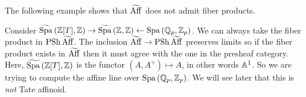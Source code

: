 \documentclass{article}
\begin{document}
The following example shows 
that $\widetilde{\mathrm{Aff}}$ does not admit fiber products.

\begin{eg}

  Consider $\widetilde{\mathrm{Spa}\,}(\mathbb{Z}[T] , \mathbb{Z}) \to \widetilde{\mathrm{Spa}\,}(\mathbb{Z} , \mathbb{Z})
  \leftarrow \mathrm{Spa}\,(\mathbb{Q}_p , \mathbb{Z}_p)$.
  We can always take the fiber product in
  $\operatorname{PSh} \widetilde{\mathrm{Aff}}$.
  The inclusion $\widetilde{\mathrm{Aff}} \to \operatorname{PSh} \widetilde{\mathrm{Aff}}$
  preserves limits so 
  if the fiber product exists in $\widetilde{\mathrm{Aff}}$
  then it must agree with the one in the presheaf category.
  Here, $\widetilde{\mathrm{Spa}\,}(\mathbb{Z}[T] , \mathbb{Z})$ 
  is the functor $(A , A^+) \mapsto A$,
  in other words $\mathbb{A}^1$. 
  So we are trying to compute the affine line over $\mathrm{Spa}\,(\mathbb{Q}_p , \mathbb{Z}_p)$.
  We will see later that this is \emph{not} Tate affinoid.
\end{eg}
\end{document}
